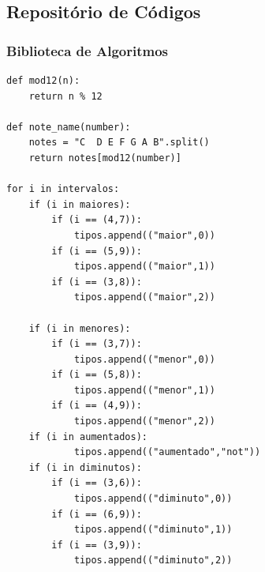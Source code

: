 \documentclass[
	12pt,				%
	openright,			%
	twoside,			%
	a4paper,			%
	english,			%
	french,				%
	spanish,			%
	brazil				%
	]{abntex2}
\begin{document}
\begin{apendicesenv}

\partapendices





\chapter{Repositório de Códigos}
\label{codigo}


\subsection{Biblioteca de Algoritmos}



\lstset{frameround=fttt,language=Python,showspaces=false,
showtabs=true,tab=\rightarrowfill}
\begin{lstlisting}[frame=trBL]
def mod12(n):
	return n % 12

def note_name(number):
	notes = "C  D E F G A B".split()
	return notes[mod12(number)]
	
for i in intervalos:
	if (i in maiores):
		if (i == (4,7)):
			tipos.append(("maior",0))
		if (i == (5,9)):
			tipos.append(("maior",1))
		if (i == (3,8)):
			tipos.append(("maior",2))
 
	if (i in menores):
		if (i == (3,7)):
			tipos.append(("menor",0))
		if (i == (5,8)):
			tipos.append(("menor",1))
		if (i == (4,9)):
			tipos.append(("menor",2))
	if (i in aumentados):
			tipos.append(("aumentado","not"))
	if (i in diminutos):
		if (i == (3,6)):
			tipos.append(("diminuto",0))
		if (i == (6,9)):
			tipos.append(("diminuto",1))
		if (i == (3,9)):
			tipos.append(("diminuto",2))
 
\end{lstlisting}





\end{apendicesenv}


\end{document}
